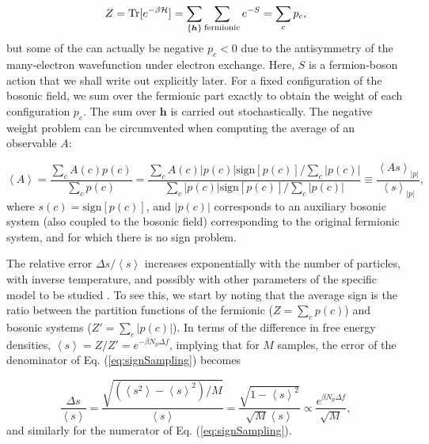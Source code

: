 \begin{equation}\label{eq:Zsign}
Z = \operatorname{Tr} [ e^{-\beta \mathcal{H} } ] = \sum_{\{ \bm h\} } \sum_{\text{fermionic}} e^{-S} = \sum_c p_c ,
\end{equation}
but some of the  can actually be negative $p_c < 0$ due to the antisymmetry of the many-electron wavefunction under electron exchange.
Here, $S$ is a fermion-boson action that we shall write out explicitly later.
For a fixed configuration of the bosonic field, we sum over the fermionic part exactly to obtain the weight of each configuration $p_c$.
The sum over $\bm h$ is carried out stochastically.
The negative weight problem can be circumvented when computing the average of an observable $A$:

\begin{equation}\label{eq:signSampling}
\left\langle A \right\rangle = \frac{\sum_c A ( c ) p ( c )}{\sum_c p ( c ) } = \frac{\sum_c A ( c )|  p ( c ) | \text{sign}[p(c)] / \sum_c | p ( c ) | }{\sum_c  |  p ( c ) | \text{sign}[p(c)] /  \sum_c | p ( c ) |} \equiv \frac{\left\langle A s \right\rangle_{|p|}}{\left\langle s \right\rangle_{|p|}} ,
\end{equation}
where $s(c) = \text{sign} [ p ( c ) ]$, and $| p ( c ) | $ corresponds to an auxiliary bosonic system (also coupled to the bosonic field) corresponding to the original fermionic system, and for which there is no sign problem.

The relative error $\Delta s / \left\langle s \right\rangle$ increases exponentially with the number of particles, with inverse temperature, and possibly with other parameters of the specific model to be studied \cite{troyer_computational_2005, hou_numerical_2009}.
To see this, we start by noting that the average sign is the ratio between the partition functions of the fermionic ($Z = \sum_c p(c)$) and bosonic systems ($Z' = \sum_c | p ( c ) |$).
In terms of the difference in free energy densities, $\left\langle s \right\rangle = Z / Z' = e^{-\beta N_p \Delta f}$, implying that for $M$ samples, the error of the denominator of Eq. (\ref{eq:signSampling}) becomes

\begin{equation}
\frac{\Delta s}{\left\langle s \right\rangle} = \frac{\sqrt{(\left\langle s^2 \right\rangle - \left\langle s \right\rangle^2 )/ M }}{\left\langle s \right\rangle} = \frac{ \sqrt{ 1 - \left\langle s \right\rangle^2}  }{\sqrt{M} \left\langle s \right\rangle} \propto \frac{e^{\beta N_p \Delta f}}{\sqrt{M}} ,
\end{equation}
and similarly for the numerator of Eq. (\ref{eq:signSampling}).


